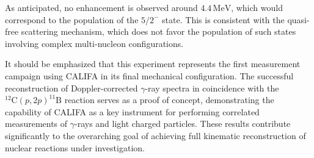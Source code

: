 As anticipated, no enhancement is observed around $4.4\,\mathrm{MeV}$, which would correspond to the population of the $5/2^-$ state. This is consistent with the quasi-free scattering mechanism, which does not favor the population of such states involving complex multi-nucleon configurations.

It should be emphasized that this experiment represents the first measurement campaign using CALIFA in its final mechanical configuration. The successful reconstruction of Doppler-corrected $\gamma$-ray spectra in coincidence with the $^{12}\mathrm{C}(p,2p)^{11}\mathrm{B}$ reaction serves as a proof of concept, demonstrating the capability of CALIFA as a key instrument for performing correlated measurements of $\gamma$-rays and light charged particles. These results contribute significantly to the overarching goal of achieving full kinematic reconstruction of nuclear reactions under investigation.


